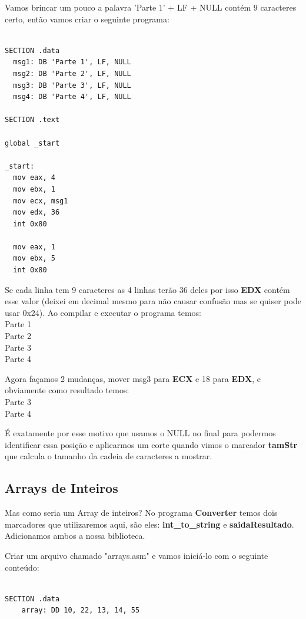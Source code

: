 Vamos brincar um pouco a palavra 'Parte 1' + LF + NULL contém 9 caracteres certo, então vamos criar o seguinte programa:
\begin{lstlisting}[]
%include 'bibliotecaE.inc'

SECTION .data
  msg1: DB 'Parte 1', LF, NULL
  msg2: DB 'Parte 2', LF, NULL
  msg3: DB 'Parte 3', LF, NULL
  msg4: DB 'Parte 4', LF, NULL

SECTION .text

global _start

_start:
  mov eax, 4
  mov ebx, 1
  mov ecx, msg1
  mov edx, 36
  int 0x80

  mov eax, 1
  mov ebx, 5
  int 0x80  
\end{lstlisting}

Se cada linha tem 9 caracteres as 4 linhas terão 36 deles por isso \textbf{EDX} contém esse valor (deixei em decimal mesmo para não causar confusão mas se quiser pode usar 0x24). Ao compilar e executar o programa temos: \\
{\ttfamily Parte 1} \\
{\ttfamily Parte 2} \\
{\ttfamily Parte 3} \\
{\ttfamily Parte 4}

Agora façamos 2 mudanças, mover msg3 para \textbf{ECX} e 18 para \textbf{EDX}, e obviamente como resultado temos: \\
{\ttfamily Parte 3} \\
{\ttfamily Parte 4}

É exatamente por esse motivo que usamos o NULL no final para podermos identificar essa posição e aplicarmos um corte quando vimos o marcador \textbf{tamStr} que calcula o tamanho da cadeia de caracteres a mostrar. 

\subsection{Arrays de Inteiros}
Mas como seria um Array de inteiros? No programa \textbf{Converter} temos dois marcadores que utilizaremos aqui, são eles: \textbf{int\_to\_string} e \textbf{saidaResultado}. Adicionamos ambos a nossa biblioteca.

Criar um arquivo chamado "arrays.asm" e vamos iniciá-lo com o seguinte conteúdo:
\begin{lstlisting}[]
%include 'bibliotecaE.inc'

SECTION .data
	array: DD 10, 22, 13, 14, 55
\end{lstlisting}

